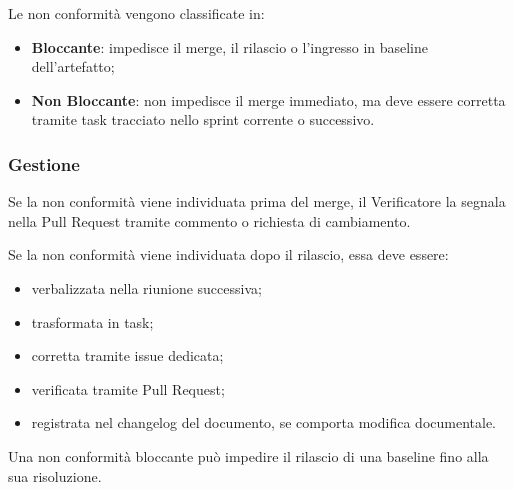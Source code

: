 Le non conformità vengono classificate in:

\begin{itemize}
    \item \textbf{Bloccante}: impedisce il merge, il rilascio o l'ingresso in baseline
    dell'artefatto;

    \item \textbf{Non Bloccante}: non impedisce il merge immediato, ma deve essere
    corretta tramite task tracciato nello sprint corrente o successivo.
\end{itemize}


\subsubsection{Gestione}

Se la non conformità viene individuata prima del merge, il Verificatore la segnala
nella Pull Request tramite commento o richiesta di cambiamento.

Se la non conformità viene individuata dopo il rilascio, essa deve essere:

\begin{itemize}
    \item verbalizzata nella riunione successiva;
    \item trasformata in task;
    \item corretta tramite issue dedicata;
    \item verificata tramite Pull Request;
    \item registrata nel changelog del documento, se comporta modifica documentale.
\end{itemize}

Una non conformità bloccante può impedire il rilascio di una baseline fino alla
sua risoluzione.
